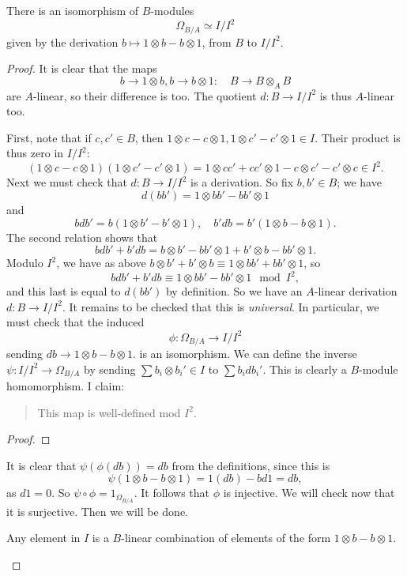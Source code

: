 \begin{proposition} \label{alternateOmega}
There is an isomorphism of $B$-modules
\[ \Omega_{B/A} \simeq I/I^2  \]
given by the derivation $b \mapsto 1 \otimes b - b \otimes 1$, from $B$ to
$I/I^2$.
\end{proposition} 
\begin{proof}
It is clear that the maps
\[ b \to 1 \otimes b, b \to b \otimes 1: \quad B \to B \otimes_A B   \]
are $A$-linear, so their difference is too. The quotient $d:B \to I/I^2$ is thus
$A$-linear too. 

First, note that if $c,c' \in B$, then $1 \otimes c - c \otimes 1, 1 \otimes c'
- c' \otimes 1 \in I$. Their product is thus zero in $I/I^2$:
\[  (1 \otimes c - c \otimes 1)(1 \otimes c'
- c' \otimes 1) = 1 \otimes cc' + cc' \otimes 1  - c \otimes c' - c' \otimes c
  \in I^2.\]
Next
we must check that $d: B \to I/I^2$ is a derivation. So fix $b, b' \in B$; we
have
\[ d(bb') =   1 \otimes bb'- bb' \otimes 1\]
and
\[ bdb' = b (   1 \otimes b'-b' \otimes 1), \quad b' db = b'(1
\otimes b - b \otimes 1  ).  \]
The second relation shows that
\[ bdb' + b' db =   b \otimes b' -  bb' \otimes 1+ b' \otimes b - bb' \otimes
1 . \]
Modulo $I^2$, we have as above $b \otimes b' + b' \otimes b \equiv 1 \otimes
bb' + bb' \otimes 1$, so 
\[   bdb' + b' db \equiv 1 \otimes bb' - bb' \otimes 1 \mod I^2,  \]
and this last is equal to $d(bb')$ by definition. So we have an $A$-linear
derivation $d: B \to I/I^2$. It remains to be checked that this is
\emph{universal}. In particular, we must check that the induced
\[ \phi: \Omega_{B/A} \to I/I^2  \]
sending $db \to 1 \otimes b - b \otimes 1$.
is an isomorphism. We can define the inverse $\psi: I/I^2 \to \Omega_{B/A}$ by sending $\sum b_i \otimes b_i'
\in I$
to $\sum b_i db_i'$. This is clearly a $B$-module homomorphism.
I claim:
\begin{quote}
This map is well-defined mod $I^2$.
\end{quote}
\begin{proof} 

\end{proof} 

It is clear that $\psi (\phi(db)) = db$ from the definitions, since this
is
\[ \psi( 1 \otimes b - b \otimes 1) = 1 (db) - b d1 = db,  \]
as $d1 = 0$. So $\psi \circ \phi = 1_{\Omega_{B/A}}$. 
It follows that $\phi$ is injective. 
We will check now that it is surjective.
Then we will be done.

\begin{lemma} 
Any element in $I$ is a $B$-linear combination of elements of the form $1
\otimes b - b \otimes 1$.
\end{lemma} 


\end{proof}
